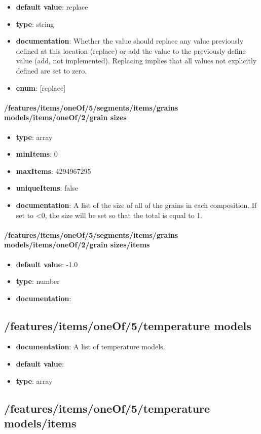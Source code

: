 \begin{itemize}\item {\bf default value}: replace
\item {\bf type}: string
\item {\bf documentation}: Whether the value should replace any value previously defined at this location (replace) or add the value to the previously define value (add, not implemented). Replacing implies that all values not explicitly defined are set to zero.
\item {\bf enum}: [replace]\end{itemize}\paragraph{/features/items/oneOf/5/segments/items/grains models/items/oneOf/2/grain sizes}
\begin{itemize}\item {\bf type}: array
\item {\bf minItems}: 0
\item {\bf maxItems}: 4294967295
\item {\bf uniqueItems}: false
\item {\bf documentation}: A list of the size of all of the grains in each composition. If set to <0, the size will be set so that the total is equal to 1.
\end{itemize}\paragraph{/features/items/oneOf/5/segments/items/grains models/items/oneOf/2/grain sizes/items}
\begin{itemize}\item {\bf default value}: -1.0
\item {\bf type}: number
\item {\bf documentation}: 
\end{itemize}\subsection{/features/items/oneOf/5/temperature models}
\begin{itemize}\item {\bf documentation}: A list of temperature models.
\item {\bf default value}: 
\item {\bf type}: array
\end{itemize}\subsection{/features/items/oneOf/5/temperature models/items}

